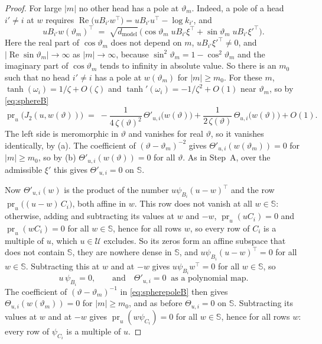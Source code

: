 \documentclass[10pt]{article}
\theoremstyle{definition}
\theoremstyle{remark}
\newcommand{\dm}{d_{\mathrm{model}}}
\begin{document}
\begin{proof}
For large $\lvert m\rvert$ no other head has a pole at $\vartheta_m$. Indeed, a pole of a head $i' \neq i$ at $w$ requires $\operatorname{Re}\big(uB_{i'}w^\top\big) = uB_{i'}u^\top - \log k_{i'}$, and
\[
uB_{i'}w(\vartheta_m)^\top \;=\; \sqrt{\dm}\,\Big(\cos\vartheta_m\;uB_{i'}\xi^\top + \sin\vartheta_m\;uB_{i'}\xi'^\top\Big).
\]
Here the real part of $\cos\vartheta_m$ does not depend on $m$, $uB_{i'}\xi'^\top \neq 0$, and $\lvert\operatorname{Re}\sin\vartheta_m\rvert \to \infty$ as $\lvert m\rvert \to \infty$, because $\sin^2\vartheta_m = 1 - \cos^2\vartheta_m$ and the imaginary part of $\cos\vartheta_m$ tends to infinity in absolute value. So there is an $m_0$ such that no head $i' \neq i$ has a pole at $w(\vartheta_m)$ for $\lvert m\rvert \ge m_0$. For these $m$, $\tanh(\omega_i) = 1/\zeta + O(\zeta)$ and $\tanh'(\omega_i) = -1/\zeta^2 + O(1)$ near $\vartheta_m$, so by \eqref{eq:sphereB}
\begin{equation}\label{eq:spherepoleB}
\operatorname{pr}_u\big(J_2(u, w(\vartheta))\big) \;=\; -\frac{1}{4\,\zeta(\vartheta)^2}\,\Theta'_{u,i}\big(w(\vartheta)\big) + \frac{1}{2\,\zeta(\vartheta)}\,\Theta_{u,i}\big(w(\vartheta)\big) + O(1).
\end{equation}
The left side is meromorphic in $\vartheta$ and vanishes for real $\vartheta$, so it vanishes identically, by (a). The coefficient of $(\vartheta - \vartheta_m)^{-2}$ gives $\Theta'_{u,i}(w(\vartheta_m)) = 0$ for $\lvert m\rvert \ge m_0$, so by (b) $\Theta'_{u,i}(w(\vartheta)) = 0$ for all $\vartheta$. As in Step~A, over the admissible $\xi'$ this gives $\Theta'_{u,i} = 0$ on $\mathbb S$.

Now $\Theta'_{u,i}(w)$ is the product of the number $u\psi_{B_i}(u - w)^\top$ and the row $\operatorname{pr}_u\big((u - w)\,C_i\big)$, both affine in $w$. This row does not vanish at all $w \in \mathbb S$: otherwise, adding and subtracting its values at $w$ and $-w$, $\operatorname{pr}_u(uC_i) = 0$ and $\operatorname{pr}_u(wC_i) = 0$ for all $w \in \mathbb S$, hence for all rows $w$, so every row of $C_i$ is a multiple of $u$, which $u \in \mathcal U$ excludes. So its zeros form an affine subspace that does not contain $\mathbb S$, they are nowhere dense in $\mathbb S$, and $u\psi_{B_i}(u - w)^\top = 0$ for all $w \in \mathbb S$. Subtracting this at $w$ and at $-w$ gives $u\psi_{B_i}w^\top = 0$ for all $w \in \mathbb S$, so
\[
u\,\psi_{B_i} = 0, \qquad\text{and}\quad \Theta'_{u,i} = 0 \ \text{ as a polynomial map.}
\]
The coefficient of $(\vartheta - \vartheta_m)^{-1}$ in \eqref{eq:spherepoleB} then gives $\Theta_{u,i}(w(\vartheta_m)) = 0$ for $\lvert m\rvert \ge m_0$, and as before $\Theta_{u,i} = 0$ on $\mathbb S$. Subtracting its values at $w$ and at $-w$ gives $\operatorname{pr}_u(w\psi_{C_i}) = 0$ for all $w \in \mathbb S$, hence for all rows $w$: every row of $\psi_{C_i}$ is a multiple of $u$.


\end{proof}
\end{document}
